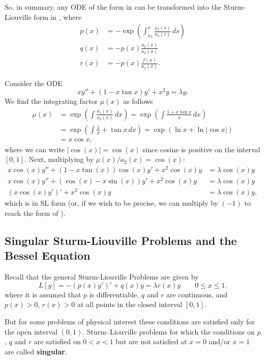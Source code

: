 So, in summary, any ODE of the form in  can be transformed into the Sturm-Liouville form in , where
\begin{align*}
	p(x) &= -\exp\left(\int_{x_0}^x \frac{a_1(s)}{a_2(s)} \,ds\right) \\
	q(x) &= -p(x)\frac{a_0(x)}{a_2(x)} \\
	r(x) &= -p(x)\frac{f(x)}{a_2(x)}.
\end{align*}

\begin{eg}
	Consider the ODE
	\[
	xy'' + (1-x\tan{x})y' + x^2y = \lambda y.
	\]
	We find the integrating factor $\mu(x)$ as follows
	\begin{align*}
		\mu(x) &= \exp\left(\int \frac{a_1(x)}{a_2(x)} \,dx\right) = \exp\left(\int \frac{1+x\tan{x}}{x} \,dx\right) \\
		&= \exp\left(\int \frac{1}{x} + \tan{x} \,dx\right) = \exp\left(\ln{x} + \ln|\cos{x}|\right) \\
		&= x\cos{x},
	\end{align*}
	where we can write $|\cos(x)| = \cos(x)$ since cosine is positive on the interval $[0,1]$. Next, multiplying by $\mu(x)/a_2(x) = \cos(x)$:
	\begin{align*}
		x\cos(x)y'' + (1-x\tan(x))\cos(x)y' + x^2\cos(x)y &= \lambda \cos(x)y \\
		x\cos(x)y'' + (\cos(x)-x\sin(x))y' + x^2\cos(x)y &= \lambda \cos(x)y \\
		\left(x\cos(x)y'\right)' + x^2\cos(x)y &= \lambda \cos(x)y,
	\end{align*}
	which is in SL form (or, if we wish to be precise, we can multiply by $(-1)$ to reach the form of ).
\end{eg}

\subsection{Singular Sturm-Liouville Problems and the Bessel Equation}\label{sec:singularsl}

Recall that the general Sturm-Liouville Problems are given by
\[
	L[y] = -\left(p(x)y'\right)' + q(x)y = \lambda r(x) y \qquad 0 \leq x \leq 1.
\]
where it is assumed that $p$ is differentiable, $q$ and $r$ are continuous, and $p(x)>0$, $r(x)>0$ at all points in the closed interval $[0,1]$.

But for some problems of physical interest these conditions are satisfied only for the open interval $(0,1)$. Sturm–Liouville problems for which the conditions on $p$, $q$ and $r$ are satisfied on $0 < x < 1$ but are not satisfied at $x = 0$ and/or $x = 1$ are called \textbf{singular}.


